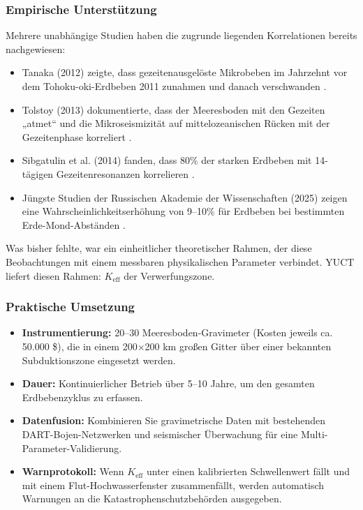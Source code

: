 \documentclass[12pt,a4paper]{article}
\theoremstyle{remark}
\begin{document}
	\subsubsection{Empirische Unterstützung}
	
	Mehrere unabhängige Studien haben die zugrunde liegenden Korrelationen bereits nachgewiesen:
	\begin{itemize}
		\item Tanaka (2012) zeigte, dass gezeitenausgelöste Mikrobeben im Jahrzehnt vor dem Tohoku-oki-Erdbeben 2011 zunahmen und danach verschwanden \cite{Tanaka2012}.
		\item Tolstoy (2013) dokumentierte, dass der Meeresboden mit den Gezeiten „atmet“ und die Mikroseismizität auf mittelozeanischen Rücken mit der Gezeitenphase korreliert \cite{Tolstoy2013}.
		\item Sibgatulin et al. (2014) fanden, dass 80\% der starken Erdbeben mit 14-tägigen Gezeitenresonanzen korrelieren \cite{Sibgatulin2014}.
		\item Jüngste Studien der Russischen Akademie der Wissenschaften (2025) zeigen eine Wahrscheinlichkeitserhöhung von 9–10\% für Erdbeben bei bestimmten Erde-Mond-Abständen \cite{RAN2025}.
	\end{itemize}
	
	Was bisher fehlte, war ein einheitlicher theoretischer Rahmen, der diese Beobachtungen mit einem messbaren physikalischen Parameter verbindet. YUCT liefert diesen Rahmen: \(K_{\mathrm{eff}}\) der Verwerfungszone.
	
	\subsubsection{Praktische Umsetzung}
	
	\begin{itemize}
		\item \textbf{Instrumentierung:} 20–30 Meeresboden-Gravimeter (Kosten jeweils ca. 50.000 \$), die in einem 200×200 km großen Gitter über einer bekannten Subduktionszone eingesetzt werden.
		\item \textbf{Dauer:} Kontinuierlicher Betrieb über 5–10 Jahre, um den gesamten Erdbebenzyklus zu erfassen.
		\item \textbf{Datenfusion:} Kombinieren Sie gravimetrische Daten mit bestehenden DART-Bojen-Netzwerken \cite{NOAA2024} und seismischer Überwachung \cite{USGS2024} für eine Multi-Parameter-Validierung.
		\item \textbf{Warnprotokoll:} Wenn \(K_{\mathrm{eff}}\) unter einen kalibrierten Schwellenwert fällt und mit einem Flut-Hochwasserfenster zusammenfällt, werden automatisch Warnungen an die Katastrophenschutzbehörden ausgegeben.
	\end{itemize}
	
\end{document}
